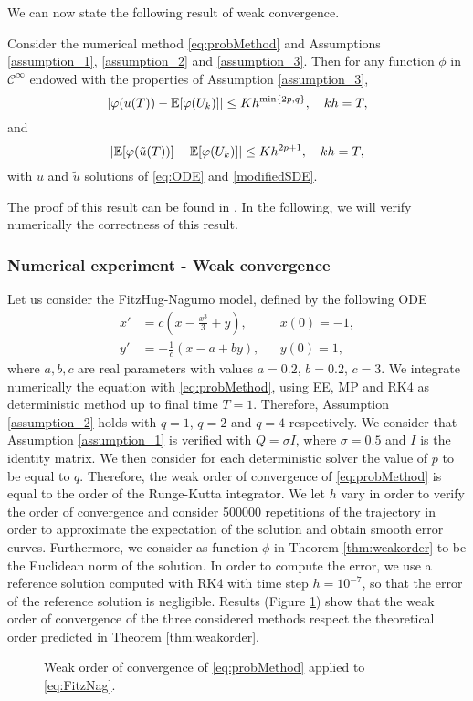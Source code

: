 \noindent We can now state the following result of weak convergence.
\begin{theorem}\label{thm:weakorder} Consider the numerical method \eqref{eq:probMethod} and Assumptions \ref{assumption_1}, \ref{assumption_2} and \ref{assumption_3}. Then for any function $\phi$ in $\mathcal{C}^\infty$ endowed with the properties of Assumption \ref{assumption_3},
\begin{equation}
	\abs{\varphi(u(T)) - \mathbb{E}[\varphi(U_k)]} \leq Kh^{\min\{2p, q\}}, \quad kh = T,
\end{equation}
and 
\begin{equation}
	\abs{\mathbb{E}[\varphi(\tilde u(T))] - \mathbb{E}[\varphi(U_k)]} \leq Kh^{2p + 1}, \quad kh = T,
\end{equation}
with $u$ and $\tilde u$ solutions of \eqref{eq:ODE} and \eqref{modifiedSDE}.
\end{theorem}
\noindent The proof of this result can be found in \cite{CGS16}. In the following, we will verify numerically the correctness of this result.

\subsubsection{Numerical experiment - Weak convergence}

Let us consider the FitzHug-Nagumo model, defined by the following ODE
\begin{equation}\label{eq:FitzNag}
\begin{aligned}
	x' &= c\left(x - \frac{x^3}{3} + y\right), && x(0) = -1, \\
	y' &= -\frac{1}{c}(x - a + by), && y(0) = 1,
\end{aligned}
\end{equation}
where $a, b, c$ are real parameters with values $a = 0.2$, $b = 0.2$, $c = 3$. We integrate numerically the equation with \eqref{eq:probMethod}, using EE, MP and RK4 as deterministic method up to final time $T = 1$. Therefore, Assumption \ref{assumption_2} holds with $q = 1$, $q = 2$ and $q = 4$ respectively. We consider that Assumption \ref{assumption_1} is verified with $Q = \sigma I$, where $\sigma = 0.5$ and $I$ is the identity matrix. We then consider for each deterministic solver the value of $p$ to be equal to $q$. Therefore, the weak order of convergence of \eqref{eq:probMethod} is equal to the order of the Runge-Kutta integrator. We let $h$ vary in order to verify the order of convergence and consider 500000 repetitions of the trajectory in order to approximate the expectation of the solution and obtain smooth error curves. Furthermore, we consider as function $\phi$ in Theorem \ref{thm:weakorder} to be the Euclidean norm of the solution. In order to compute the error, we use a reference solution computed with RK4 with time step $h = 10^{-7}$, so that the error of the reference solution is negligible. Results (Figure \ref{fig:weakorder}) show that the weak order of convergence of the three considered methods respect the theoretical order predicted in Theorem \ref{thm:weakorder}.

\begin{figure}
\centering
\resizebox{0.6\linewidth}{!}{}
\caption{Weak order of convergence of \eqref{eq:probMethod} applied to \eqref{eq:FitzNag}.}
\label{fig:weakorder}
\end{figure}